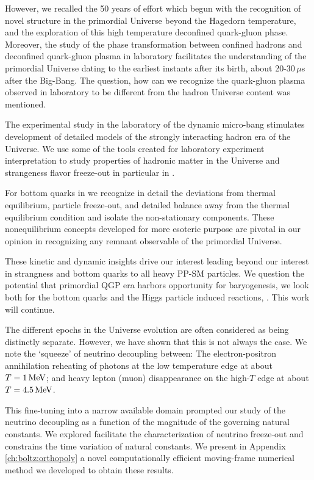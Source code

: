 However, we recalled the 50 years of effort which begun with the recognition of novel structure in the primordial Universe beyond the Hagedorn temperature, and the exploration of this high temperature deconfined quark-gluon phase. Moreover, the study of the phase transformation between confined hadrons and deconfined quark-gluon plasma in laboratory facilitates the understanding of the primordial Universe dating to the earliest instants after its birth, about 20-30\,$\mu$s after the Big-Bang. The question, how can we recognize the quark-gluon plasma observed in laboratory to be different from the hadron Universe content was mentioned. 

The experimental study in the laboratory  of the dynamic micro-bang stimulates development of detailed models of the strongly interacting hadron era of the Universe. We use some of the  tools created for laboratory experiment interpretation to study properties of hadronic matter in the Universe and strangeness flavor freeze-out in particular in .  

For bottom quarks in  we recognize in detail the deviations from thermal equilibrium, particle freeze-out, and detailed balance away from the thermal equilibrium condition and isolate the non-stationary components. These nonequilibrium concepts developed for more esoteric purpose are pivotal in our opinion in recognizing any remnant observable of the primordial Universe. 

These kinetic and dynamic insights drive our interest leading beyond our interest in strangness and bottom quarks to all heavy PP-SM particles. We question the potential that primordial QGP era harbors opportunity  for baryogenesis, we look both for the bottom quarks and the Higgs particle induced reactions, . This work will continue.

The different epochs in the Universe evolution are often considered as being distinctly separate. However, we have shown that this is not always the case. We note the `squeeze' of neutrino decoupling between: The electron-positron annihilation reheating of photons at the low temperature edge at about $T=1\text{\,MeV}$; and heavy lepton (muon) disappearance on the high-$T$ edge at about $T=4.5\text{\,MeV}$. 

This fine-tuning into a narrow available domain prompted our study of the neutrino decoupling as a function of the magnitude of the governing natural constants. We explored facilitate the characterization of neutrino freeze-out and constrains the time variation of natural constants. We present  in Appendix \ref{ch:boltz:orthopoly} a novel computationally efficient moving-frame numerical method we developed to obtain these results.

